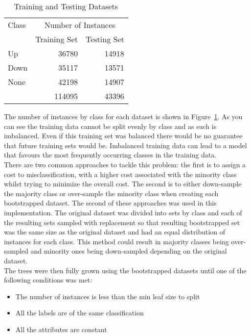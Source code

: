 		\begin{table}[h]
			\centering
			\begin{tabular}{lrr}
				\toprule
				{Class}		& \multicolumn{2}{c}{Number of Instances}\\
				{}			& \multicolumn{1}{c}{Training Set} & \multicolumn{1}{c}{Testing Set}\\							
				\midrule
				{Up} 		& 36780		& 14918\\
				{Down}		& 35117		& 13571\\
				{None}		& 42198		& 14907\\
				\bottomrule
				{}			& 114095		& 43396\\
			\end{tabular}
			\caption{Training and Testing Datasets}
			\label{tab:trainingAndTestingDatasets}
		\end{table}		
		
		The number of instances by class for each dataset is shown in Figure~\ref{tab:trainingAndTestingDatasets}. As you can see the training data cannot be split evenly by class and as such is imbalanced. Even if this training set was balanced there would be no  guarantee that future training sets would be. Imbalanced training data can lead to a model that favours the most frequently occurring classes in the training data.\\
		
		There are two common approaches to tackle this problem: the first is to assign a cost to misclassification, with a higher cost associated with the minority class whilst trying to minimize the overall cost. The second is to either down-sample the majority class or over-sample the minority class when creating each bootstrapped dataset\cite{chen2004using}. The second of these approaches was used in this implementation. The original dataset was divided into sets by class and each of the resulting sets sampled with replacement so that resulting bootstrapped set was the same size as the original dataset and had an equal distribution of instances for each class. This method could result in majority classes being over-sampled and minority ones being down-sampled depending on the original dataset.\\
		
		The trees were then fully grown using the bootstrapped datasets until one of the following conditions was met:
		
		\begin{itemize}
			\item The number of instances is less than the min leaf size to split
			\item All the labels are of the same classification
			\item All the attributes are constant
		\end{itemize}
		
